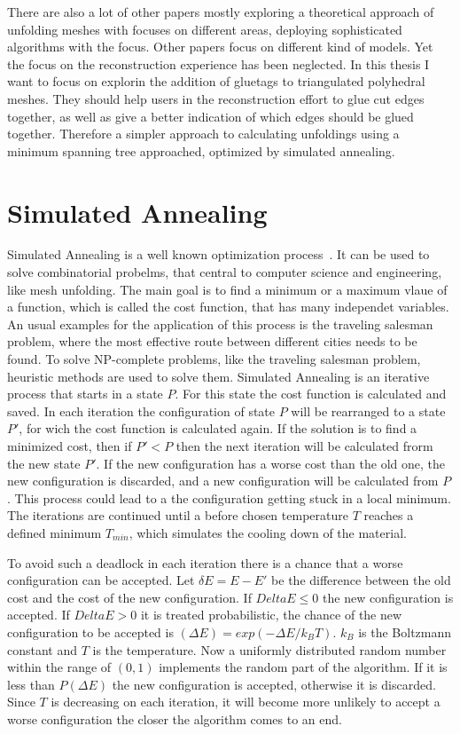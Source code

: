 \documentclass[draft,final]{vutinfth} %
\begin{document}
There are also a lot of other papers mostly exploring a theoretical approach of unfolding meshes with focuses on different areas, deploying sophisticated algorithms with the focus. Other papers focus on different kind of models. Yet the focus on the reconstruction experience has been neglected. In this thesis I want to focus on explorin the addition of gluetags to triangulated polyhedral meshes. They should help users in the reconstruction effort to glue cut edges together, as well as give a better indication of which edges should be glued together. Therefore a simpler approach to calculating unfoldings using a minimum spanning tree approached, optimized by simulated annealing.

\section{Simulated Annealing}

Simulated Annealing is a well known optimization process~\cite{kirkpatrick1983optimization}. It can be used to solve combinatorial probelms, that central to computer science and engineering, like mesh unfolding. The main goal is to find a minimum or a maximum vlaue of a function, which is called the cost function, that has many independet variables. An usual examples for the application of this process is the traveling salesman problem, where the most effective route between different cities needs to be found. To solve NP-complete problems, like the traveling salesman problem, heuristic methods are used to solve them.
Simulated Annealing is an iterative process that starts in a state $P$. For this state the cost function is calculated and saved. In each iteration the configuration of state $P$ will be rearranged to a state $P'$, for wich the cost function is calculated again. If the solution is to find a minimized cost, then if $P' < P$ then the next iteration will be calculated frorm the new state $P'$. If the new configuration has a worse cost than the old one, the new configuration is discarded, and a new configuration will be calculated from $P$. This process could lead to a the configuration getting stuck in a local minimum. The iterations are continued until a before chosen temperature $T$ reaches a defined minimum $T_{min}$, which simulates the cooling down of the material.

To avoid such a deadlock in each iteration there is a chance that a worse configuration can be accepted. Let $\delta E = E - E'$ be the difference between the old cost and the cost of the new configuration. If $Delta E \leq 0$ the new configuration is accepted. If $Delta E > 0$ it is treated probabilistic, the chance of the new configuration to be accepted is $(\Delta E) = exp(-\Delta E / k_B T)$. $k_B$ is the Boltzmann constant and $T$ is the temperature. Now a uniformly distributed random number within the range of $(0,1)$ implements the random part of the algorithm. If it is less than $P(\Delta E)$ the new configuration is accepted, otherwise it is discarded. Since $T$ is decreasing on each iteration, it will become more unlikely to accept a worse configuration the closer the algorithm comes to an end.
\end{document}
